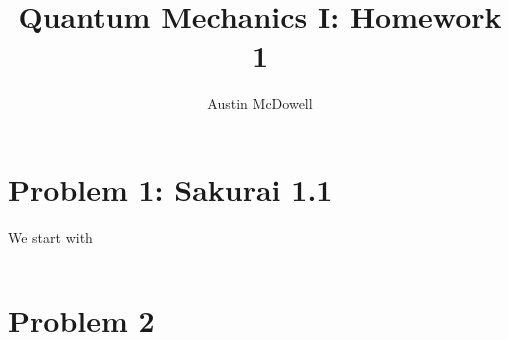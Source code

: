 \documentclass[11pt]{article}
\title{Quantum Mechanics I: Homework 1}
\author{Austin McDowell}
\begin{document}
\maketitle

\section{Problem 1: Sakurai 1.1}

We start with

\begin{displaymath}

\end{displaymath}

\section{Problem 2}
\end{document}
